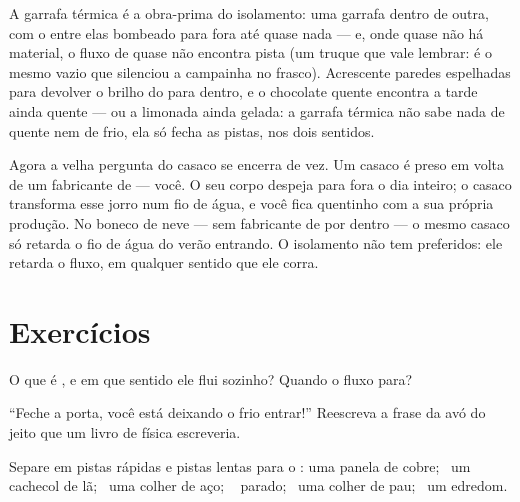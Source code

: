 \begin{example}\label{ex:g5:heat-and-insulation:thermos}
A garrafa térmica é a obra-prima do isolamento: uma garrafa dentro de
outra, com o  entre elas bombeado para fora até quase nada --- e,
onde quase não há material, o fluxo de  quase não encontra pista
(um truque que vale lembrar: é o mesmo vazio que silenciou a
campainha no frasco). Acrescente paredes espelhadas para devolver o
brilho do  para dentro, e o chocolate quente encontra a tarde
ainda quente --- ou a limonada ainda gelada: a garrafa térmica não
sabe nada de quente nem de frio, ela só fecha as pistas, nos dois
sentidos.
\end{example}

\begin{remark}\label{rem:g5:heat-and-insulation:coat}
Agora a velha pergunta do casaco se encerra de vez. Um casaco é 
preso em volta de um fabricante de  --- você. O seu corpo
despeja  para fora o dia inteiro; o casaco transforma esse jorro
num fio de água, e você fica quentinho com a sua própria produção. No
boneco de neve --- sem fabricante de  por dentro --- o mesmo
casaco só retarda o fio de água do verão entrando. O isolamento não
tem preferidos: ele retarda o fluxo, em qualquer sentido que ele
corra.
\end{remark}

\section{Exercícios}

\begin{exercise}[$\star$]\label{exo:g5:heat-and-insulation:1}
O que é , e em que sentido ele flui sozinho? Quando o fluxo
para?
\end{exercise}

\begin{exercise}[$\star$]\label{exo:g5:heat-and-insulation:2}
``Feche a porta, você está deixando o frio entrar!'' Reescreva a
frase da avó do jeito que um livro de física escreveria.
\end{exercise}

\begin{exercise}[$\star$]\label{exo:g5:heat-and-insulation:3}
Separe em pistas rápidas e pistas lentas para o : uma panela de
cobre; \ um cachecol de lã; \ uma colher de aço; \  parado; \ uma
colher de pau; \ um edredom.
\end{exercise}

